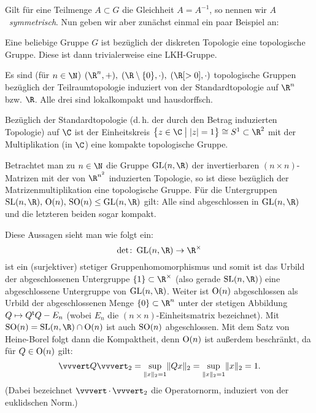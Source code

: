 Gilt für eine Teilmenge $A\subset G$ die Gleichheit $A=A^{-1}$, so nennen wir
$A$~\emph{symmetrisch}. Nun geben wir aber zunächst einmal ein paar Beispiel an:
\begin{BspList}
\item
    Eine beliebige Gruppe $G$ ist bezüglich der diskreten Topologie eine
    topologische Gruppe. Diese ist dann trivialerweise eine LKH-Gruppe.
    
\item
    Es sind (für $n\in\N$) $(\R^n,+),\; (\R\setminus\{0\},\cdot),\; 
    (\R[>0], \cdot)$ topologische Gruppen bezüglich der Teilraumtopologie
    induziert von der Standardtopologie auf $\R^n$ bzw. $\R$. Alle drei sind
    lokalkompakt und hausdorffsch.

\item
    Bezüglich der Standardtopologie (d.\,h. der durch den Betrag induzierten
    Topologie) auf $\C$ ist der Einheitskreis 
    $\left\{ z\in\C \;\big\vert\; \abs{z}=1 \right\} \cong S^1 \subset \R^2$ mit
    der Multiplikation (in $\C$) eine kompakte topologische Gruppe.

\item
    Betrachtet man zu $n\in\N$ die Gruppe $\matGL(n,\R)$ der
    invertierbaren $(n\!\times\!n)$-Matrizen mit der von $\R^{n^2}$ induzierten
    Topologie, so ist diese bezüglich der Matrizenmultiplikation eine
    topologische Gruppe. Für die Untergruppen $\matSL(n,\R),\,\matO(n),\,\matSO(n)
    \leq \matGL(n,\R)$ gilt: Alle sind abgeschlossen in $\matGL(n,\R)$ und
    die letzteren beiden sogar kompakt.
    
    Diese Aussagen sieht man wie folgt ein:
    \vspace{-3pt} \[    %
        \det\colon\matGL(n,\R)\to\R^\times 
    \vspace{-3pt} \] 
    ist ein (surjektiver) stetiger Gruppenhomomorphismus und somit ist das
    Urbild der abgeschlossenen Untergruppe $\{1\} \subset \R^\times$ (also
    gerade $\matSL(n,\R)$) eine abgeschlossene Untergruppe von $\matGL(n,\R)$.
    Weiter ist $\operatorname{O}(n)$ abgeschlossen als Urbild der abgeschlossenen Menge
    $\{0\} \subset \R^n$ unter der stetigen Abbildung $Q\mapsto Q^\mathsf{t} Q - E_n$
    (wobei $E_n$ die $(n\!\times\!n)$-Einheitsmatrix bezeichnet). Mit $\matSO(n)
    = \matSL(n,\R) \cap \matO(n)$ ist auch $\operatorname{SO}(n)$ abgeschlossen.
    Mit dem Satz von Heine-Borel folgt dann die Kompaktheit, denn $\operatorname{O}(n)$ ist
    außerdem beschränkt, da für $Q\in\operatorname{O}(n)$ gilt: 
    \[ \opnorm{Q}_2 = \sup_{\norm{x}_2=1} \norm{Qx}_2 
        = \sup_{\norm{x}_2=1} \norm{x}_2 = 1
    . \]
    (Dabei bezeichnet $\opnorm{\,\cdot\,}_2$ die Operatornorm, induziert von der
    euklidschen Norm.)
    

\end{BspList}
